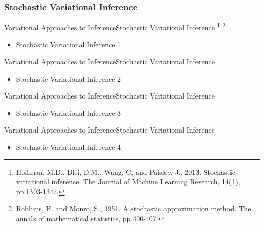 \documentclass[AERbeamer%
              ,optEnglish%
              ,optBiber%
              ,optBibstyleAlphabetic%
              ,optBeamerClassicFormat%
              ]{AERlatex}%
\begin{document}
\subsubsection*{Stochastic Variational Inference}
\begin{frame}[c]{Variational Approaches to Inference}{Stochastic Variational Inference \footnote{Hoffman, M.D., Blei, D.M., Wang, C. and Paisley, J., 2013. Stochastic variational
                                                                                                 inference. The Journal of Machine Learning Research, 14(1), pp.1303-1347.}
                                                                                       \footnote{Robbins, H. and Monro, S., 1951. A stochastic approximation method. The annals of 
                                                                                                 mathematical statistics, pp.400-407.}}
    \centering
    \begin{itemize}
        \item Stochastic Variational Inference 1
    \end{itemize}
\end{frame}


\begin{frame}[c]{Variational Approaches to Inference}{Stochastic Variational Inference}
    \centering
    \begin{itemize}
        \item Stochastic Variational Inference 2
    \end{itemize}
\end{frame}


\begin{frame}[c]{Variational Approaches to Inference}{Stochastic Variational Inference}
    \centering
    \begin{itemize}
        \item Stochastic Variational Inference 3
    \end{itemize}
\end{frame}


\begin{frame}[c]{Variational Approaches to Inference}{Stochastic Variational Inference}
    \centering
    \begin{itemize}
        \item Stochastic Variational Inference 4
    \end{itemize}
\end{frame}
\end{document}

